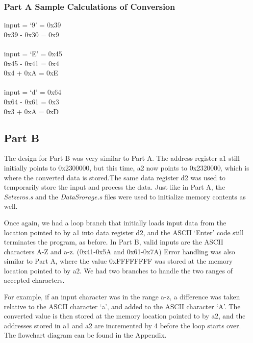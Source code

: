 \documentclass[letterpaper]{article}
\begin{document}

    \subsubsection{Part A Sample Calculations of Conversion}

        input = `9' = 0x39\\
        0x39 - 0x30 = 0x9\\
        \\
        input = `E' = 0x45\\
        0x45 - 0x41 = 0x4\\
        0x4 + 0xA = 0xE\\
        \\
        input = `d' = 0x64\\
        0x64 - 0x61 = 0x3\\
        0x3 + 0xA = 0xD



  \subsection{Part B}
    The design for Part B was very similar to Part A. The address register a1 still
    initially points to 0x2300000, but this time, a2 now points to 0x2320000, which is
    where the converted data is stored.The same data register d2 was used to temporarily
    store the input and process the data. Just like in Part A, the \textit{Setzeros.s} and the \textit{DataSrorage.s} files
    were used to initialize memory contents as well.

    Once again, we had a loop branch that initially loads input data from the location
    pointed to by a1 into data register d2, and the ASCII `Enter' code still terminates
    the program, as before. In Part B, valid inputs are the ASCII characters A-Z and a-z.
    (0x41-0x5A and 0x61-0x7A)
    Error handling was also similar to Part A, where the value 0xFFFFFFFF was stored at the
    memory location pointed to by a2. We had two branches to handle the two ranges of accepted
    characters.

    For example, if an input character was in the range a-z, a difference was taken
    relative to the ASCII character `a', and added to the ASCII character `A'. The
    converted value is then stored at the memory location pointed to by a2, and
    the addresses stored in a1 and a2 are incremented by 4 before the loop
    starts over. The flowchart diagram can be found in the Appendix.
\end{document}
